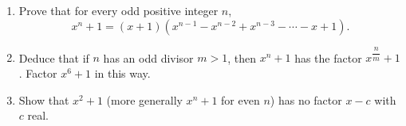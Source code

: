 \begin{enumerate}
\item[(a)] Prove that for every odd positive integer $n$,
\[
x^n+1=(x+1)\left(x^{n-1}-x^{n-2}+x^{n-3}-\cdots-x+1\right).
\]
\item[(b)] Deduce that if $n$ has an odd divisor $m>1$, then $x^n+1$ has the factor $x^{\dfrac {n}{m}}+1$. Factor $x^6+1$ in this way.
\item[(c)] Show that $x^2+1$ (more generally $x^{n}+1$ for even $n$) has no factor $x-c$ with $c$ real.
\end{enumerate}
